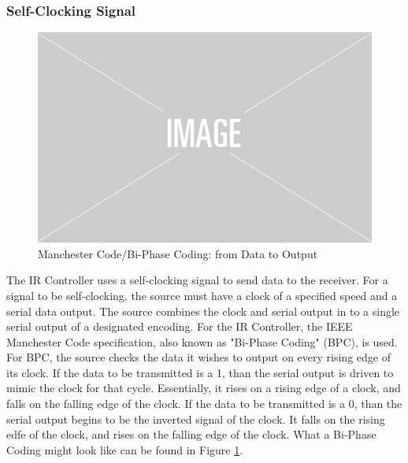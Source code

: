 \documentclass[]{article}
\begin{document}
\subsubsection{Self-Clocking Signal}
\begin{figure}[H]\centering
    \includegraphics[width=0.5\linewidth]{figures/placeholder.png}
    \caption{Manchester Code/Bi-Phase Coding: from Data to Output} 
    \label{fig:biPhaseExample}
\end{figure}
\label{subsubsec:selfClockingSignal}
The IR Controller uses a self-clocking signal to send data to the receiver.
For a signal to be self-clocking, the source must have a clock of a specified speed and a serial data output.
The source combines the clock and serial output in to a single serial output of a designated encoding.
For the IR Controller, the IEEE Manchester Code specification, also known as "Bi-Phase Coding" (BPC), is used.
For BPC, the source checks the data it wishes to output on every rising edge of its clock.
If the data to be transmitted is a 1, than the serial output is driven to mimic the clock for that cycle.
Essentially, it rises on a rising edge of a clock, and falls on the falling edge of the clock.
If the data to be transmitted is a 0, than the serial output begins to be the inverted signal of the clock.
It falls on the rising edfe of the clock, and rises on the falling edge of the clock. 
What a Bi-Phase Coding might look like can be found in Figure \ref{fig:biPhaseExample}.
\end{document}
